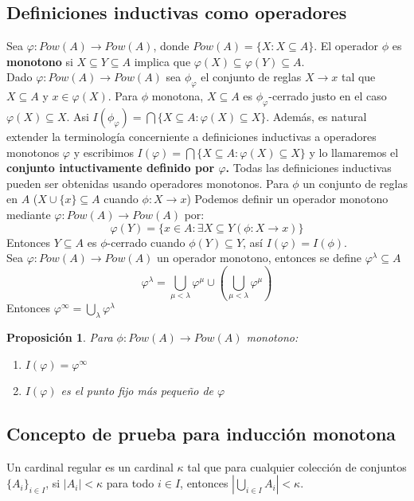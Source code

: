 \documentclass[executivepaper]{article}
\newtheorem{propo}{Proposición}[section]
\begin{document}
\subsection{Definiciones inductivas como operadores}
Sea $\varphi:Pow(A)\rightarrow Pow(A)$, donde $Pow(A)=\{X:X\subseteq A\}$. El operador $\phi$ es \textbf{monotono} si $X\subseteq Y \subseteq A$ implica que $\varphi(X)\subseteq \varphi(Y) \subseteq A$.\\ 
Dado $\varphi:Pow(A)\rightarrow Pow(A)$ sea $\phi_{\varphi}$ el conjunto de reglas $X\rightarrow x$ tal que $X\subseteq A$ y $x \in \varphi(X)$. Para $\phi$ monotona, $X \subseteq A$ es $\phi_{\varphi}$-cerrado justo en el caso $\varphi(X) \subseteq X$. Asi $I(\phi_{\varphi})=\bigcap\{X \subseteq A: \varphi(X) \subseteq X\}$. Además, es natural extender la terminología concerniente a definiciones inductivas a operadores monotonos $\varphi$ y escribimos $I(\varphi)=\bigcap\{X \subseteq A: \varphi(X) \subseteq X\}$ y lo llamaremos el \textbf{conjunto intuctivamente definido por $\varphi$.} Todas las definiciones inductivas pueden ser obtenidas usando operadores monotonos. Para $\phi$ un conjunto de reglas en $A$ ($X\cup\{x\}\subseteq A$ cuando $\phi:X\rightarrow x$) Podemos definir un operador monotono mediante $\varphi:Pow(A)\rightarrow Pow(A)$ por:
$$\varphi(Y)=\{x\in A:\exists X\subseteq Y (\phi:X\rightarrow x)\}$$
Entonces $Y\subseteq A$ es $\phi$-cerrado cuando $\phi(Y)\subseteq Y$, así $I(\varphi)=I(\phi)$.\\

Sea $\varphi : Pow(A) \rightarrow Pow(A)$ un operador monotono, entonces se define $\varphi^\lambda\subseteq A$
$$\varphi^\lambda = \bigcup_{\mu<\lambda}\varphi^{\mu}\cup(\bigcup_{\mu<\lambda}\varphi^{\mu}) $$
Entonces $\varphi^{\infty}=\bigcup_{\lambda}\varphi^{\lambda}$
\begin{propo}
    Para $\phi:Pow(A)\rightarrow Pow(A)$ monotono:
    \begin{enumerate}
        \item $I(\varphi)=\varphi^{\infty}$
        \item $I(\varphi)$ es el punto fijo más pequeño de $\varphi$
    \end{enumerate}

\end{propo}
\subsection*{Concepto de prueba para inducción monotona}
Un cardinal regular es un cardinal $\kappa$ tal que para cualquier colección de conjuntos $\{A_i\}_{i\in I}$, si $\vert A_i \vert < \kappa$ para todo $i\in I$, entonces $\left\vert \bigcup_{i\in I} A_i \right\vert < \kappa$.
\end{document}
